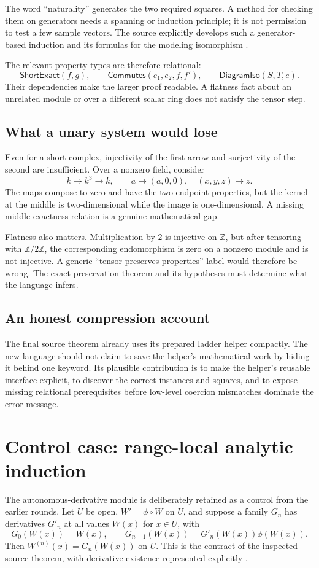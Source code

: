 \documentclass[11pt,a4paper]{article}
\newcommand{\Z}{\mathbb Z}\newcommand{\N}{\mathbb N}
\theoremstyle{plain}
\theoremstyle{definition}
\theoremstyle{remark}
\begin{document}
The word ``naturality'' generates the two required squares. A method for
checking them on generators needs a spanning or induction principle; it is
not permission to test a few sample vectors. The source explicitly develops
such a generator-based induction and its formulas for the modeling
isomorphism \cite{exactsource}.

The relevant property types are therefore relational:
\[
 \mathsf{ShortExact}(f,g),\qquad
 \mathsf{Commutes}(e_1,e_2,f,f'),\qquad
 \mathsf{DiagramIso}(S,T,e).
\]
Their dependencies make the larger proof readable. A flatness fact about an
unrelated module or over a different scalar ring does not satisfy the tensor
step.

\subsection{What a unary system would lose}
Even for a short complex, injectivity of the first arrow and surjectivity of
the second are insufficient. Over a nonzero field, consider
\[
 k\longrightarrow k^3\longrightarrow k,
 \qquad a\longmapsto(a,0,0),\quad (x,y,z)\longmapsto z.
\]
The maps compose to zero and have the two endpoint properties, but the
kernel at the middle is two-dimensional while the image is one-dimensional.
A missing middle-exactness relation is a genuine mathematical gap.

Flatness also matters. Multiplication by $2$ is injective on $\Z$, but after
tensoring with $\Z/2\Z$, the corresponding endomorphism is zero on a nonzero
module and is not injective. A generic ``tensor preserves properties'' label
would therefore be wrong. The exact preservation theorem and its hypotheses
must determine what the language infers.

\subsection{An honest compression account}
The final source theorem already uses its prepared ladder helper compactly.
The new language should not claim to save the helper's mathematical work by
hiding it behind one keyword. Its plausible contribution is to make the
helper's reusable interface explicit, to discover the correct instances and
squares, and to expose missing relational prerequisites before low-level
coercion mismatches dominate the error message.

\section{Control case: range-local analytic induction}
\label{sec:ode}
The autonomous-derivative module is deliberately retained as a control from
the earlier rounds. Let $U$ be open, $W'=\phi\circ W$ on $U$, and suppose a
family $G_n$ has derivatives $G'_n$ at all values $W(x)$ for $x\in U$, with
\[
 G_0(W(x))=W(x),\qquad
 G_{n+1}(W(x))=G'_n(W(x))\phi(W(x)).
\]
Then $W^{(n)}(x)=G_n(W(x))$ on $U$. This is the contract of the inspected
source theorem, with derivative existence represented explicitly
\cite{odesource}.
\end{document}
